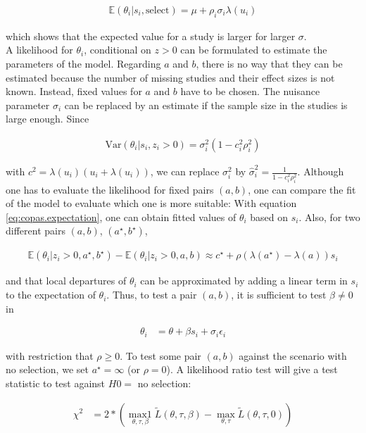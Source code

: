 \documentclass[11pt,a4paper,twoside]{book}\usepackage[]{graphicx}\usepackage[]{color}
\begin{document}
\begin{align}
\mathbb{E}(\theta_i|s_i, \textrm{select}) = \mu + \rho_i\sigma_i\lambda(u_i) \label{eq:copas.expectation}
\end{align}

which shows that the expected value for a study is larger for larger $\sigma$. \\
A likelihood for $\theta_i$, conditional on $z>0$ can be formulated to estimate the parameters of the model. Regarding $a$ and $b$, there is no way that they can be estimated because the number of missing studies and their effect sizes is not known. Instead, fixed values for $a$ and $b$ have to be chosen.
The nuisance parameter $\sigma_i$ can be replaced by an estimate if the sample size in the studies is large enough. Since

\begin{align}
\textrm{Var}(\theta_i| s_i, z_i > 0) = \sigma_i^2 (1 - c_i^2\rho_i^2) \nonumber
\end{align}

with $c^2 = \lambda(u_i)(u_i + \lambda(u_i))$, we can replace $\sigma_i^2$ by $\hat{\sigma}_i^2 = \frac{1}{1-c_i^2\rho_i^2}$. Although one has to evaluate the likelihood for fixed pairs $(a,b)$, one can compare the fit of the model to evaluate which one is more suitable:
With equation \ref{eq:copas.expectation}, one can obtain fitted values of $\theta_i$ based on $s_i$. Also, for two different pairs $(a,b)$, $(a^\star, b^\star)$,

\begin{align}
\mathbb{E}(\theta_i|z_i > 0, a^\star, b^\star) - \mathbb{E}(\theta_i|z_i > 0, a, b) \approx c^\star + \rho(\lambda(a^\star) - \lambda(a))s_i \nonumber
\end{align}

and that local departures of $\theta_i$ can be approximated by adding a linear term in $s_i$ to the expectation of $\theta_i$. Thus, to test a pair $(a,b)$, it is sufficient to test $\beta \neq 0$ in

\begin{align}
\theta_i &= \theta + \beta s_i + \sigma_i \epsilon_i \nonumber
\end{align}

with restriction that $\rho \geq 0$. To test some pair $(a,b)$ against the scenario with no selection, we set $a^\star = \infty$ (or $\rho = 0$). A likelihood ratio test will give a test statistic to test against $H0 =$ no selection:

\begin{align}
\chi^2 &= 2*(\operatorname*{max1}_{\theta, \tau, \beta}\tilde{L}(\theta, \tau, \beta) - \operatorname*{max}_{\theta, \tau}\tilde{L}(\theta, \tau, 0)) \label{eq:copas.small.study}
\end{align}
\end{document}
